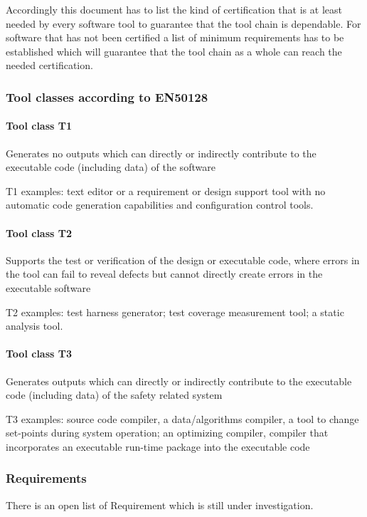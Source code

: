\documentclass{template/openetcs_article}
\begin{document}
Accordingly this document has to list the kind of certification that is at least needed by every software tool to guarantee that the tool chain is dependable. For software that has not been certified a list of minimum requirements has to be established which will guarantee that the tool chain as a whole can reach the needed certification.


\subsubsection{Tool classes according to EN50128}
\paragraph{Tool class T1}
Generates no outputs which can directly or indirectly contribute to the executable code (including data) of the software 

T1 examples: text editor or a requirement or design support tool with no automatic code generation capabilities and configuration control tools. 


\paragraph{Tool class T2}
Supports the test or verification of the design or executable code, where errors in the tool can fail to reveal defects but cannot directly create errors in the executable software 

T2 examples: test harness generator; test coverage measurement tool; a static analysis tool. 

\paragraph{Tool class T3}
Generates outputs which can directly or indirectly contribute to the executable code (including data) of the safety related system 

T3 examples: source code compiler, a data/algorithms compiler, a tool to change set-points during system operation; an optimizing compiler, compiler that incorporates an executable run-time package into the executable code

\subsubsection{Requirements }
There is an open list of Requirement which is still under investigation.
\end{document}
